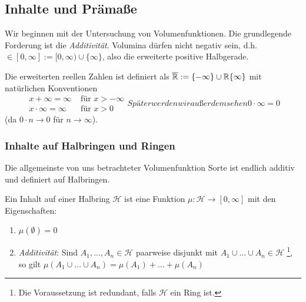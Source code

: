 \subsection{Inhalte und Prämaße}
Wir beginnen mit der Untersuchung von Volumenfunktionen. Die grundlegende Forderung ist die \emph{Additivität}. Volumina dürfen nicht negativ sein, d.h. $\in [0,\infty] := [0, \infty) \cup \{ \infty\}$, also die erweiterte positive Halbgerade. 
\begin{remark}
Die erweiterten reellen Zahlen ist definiert als $\overline{\mathbb{R}} := \{- \infty\} \cup \mathbb{R} \{ \infty \}$ mit natürlichen Konventionen
\begin{subequations}
\begin{align}
	x + \infty = \infty & \text{ für } x > - \infty	\\
	x \cdot \infty = \infty &\text{ für } x> 0
\end{align}
Später werden wir außerdem sehen 
\begin{equation}
	0 \cdot \infty = 0
\end{equation}
\end{subequations}
(da $ 0 \cdot n \longrightarrow 0$ für $n \longrightarrow \infty$).
\end{remark}
\subsubsection{Inhalte auf Halbringen und Ringen}
Die allgemeinste von uns betrachteter Volumenfunktion Sorte ist endlich additiv und definiert auf Halbringen.

\begin{definition}
\begin{mdframed}
Ein Inhalt auf einer Halbring $\mathcal{H}$ ist eine Funktion $\mu: \mathcal{H} \to [0,\infty]$ mit den Eigenschaften:
\begin{enumerate}[(\roman*),topsep=5pt, itemsep = 0 pt]
	\item $\mu (\emptyset) = 0$
	\item \emph{Additivität}: Sind $A_1,...,A_n \in \mathcal{H}$ paarweise disjunkt mit $A_1 \cup ... \cup A_n \in \mathcal{H}$ \footnote{Die Voraussetzung ist redundant, falls $\mathcal{H}$ ein Ring ist.}, so gilt $\mu(A_1 \cup ... \cup A_n) = \mu(A_1) + ... +\mu(A_n)$
\end{enumerate}
\end{mdframed}
\end{definition}

